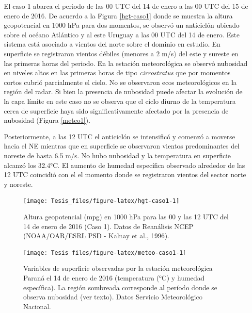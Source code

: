 \documentclass[12pt,spanish,oneside, a4paper]{book}
\begin{document}
El caso 1 abarca el periodo de las 00 UTC del 14 de enero a las 00 UTC
del 15 de enero de 2016. De acuerdo a la Figura \ref{hgt-caso1} donde se
muestra la altura geopotencial en 1000 hPa para dos momentos, se observó
un anticiclón ubicado sobre el océano Atlántico y al este Uruguay a las
00 UTC del 14 de enero. Este sistema está asociado a vientos del norte
sobre el dominio en estudio. En superficie se registraron vientos
débiles (menores a 2 m/s) del este y sureste en las primeras horas del
periodo. En la estación meteorológica se observó nubosidad en niveles
altos en las primeras horas de tipo \emph{cirrostratus} que por momentos
cortos cubrió parcialmente el cielo. No se observaron ecos
meteorológicos en la región del radar. Si bien la presencia de nubosidad
puede afectar la evolución de la capa límite en este caso no se observa
que el ciclo diurno de la temperatura cerca de superficie haya sido
significativamente afectado por la presencia de nubosidad (Figura
\ref{meteo1}).

Posteriormente, a las 12 UTC el anticiclón se intensificó y comenzó a
moverse hacia el NE mientras que en superficie se observaron vientos
predominantes del noreste de hasta 6.5 m/s. No hubo nubosidad y la
temperatura en superficie alcanzó los 32.4°C. El aumento de humedad
específica observado alrededor de las 12 UTC coincidió con el el momento
donde se registraron vientos del sector norte y noreste.

\begin{figure}

{\centering \texttt{[image: Tesis\_files/figure-latex/hgt-caso1-1]} 

}

\caption{Altura geopotencial (mpg) en 1000 hPa para las 00 y las 12 UTC del 14 de enero de 2016 (Caso 1). Datos de Reanálisis NCEP (NOAA/OAR/ESRL PSD - Kalnay et al., 1996). \label{hgt-caso1}}\label{fig:hgt-caso1}
\end{figure}

\begin{figure}

{\centering \texttt{[image: Tesis\_files/figure-latex/meteo-caso1-1]} 

}

\caption{Variables de superficie observadas por la estación meteorológica Paraná el 14 de enero de 2016 (temperatura (°C) y humedad específica). La región sombreada corresponde al período donde se observa nubosidad (ver texto). Datos Servicio Meteorológico Nacional. \label{meteo1}}\label{fig:meteo-caso1}
\end{figure}
\end{document}
